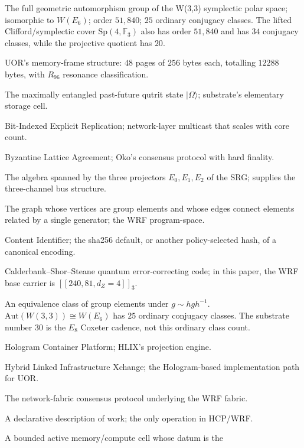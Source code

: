 \documentclass[11pt,letterpaper]{article}
\theoremstyle{remark}
\newcommand{\W}{W(3,3)}
\newcommand{\Sp}{\mathrm{Sp}}
\newcommand{\Aut}{\mathrm{Aut}}
\newcommand{\FF}{\mathbb{F}}
\newcommand{\ket}[1]{\lvert #1\rangle}
\begin{document}
\begin{description}[leftmargin=10em,style=nextline,nosep]
\item[Aut$(W(3,3))$] The full geometric automorphism group of the W(3,3) symplectic
polar space; isomorphic to $W(E_6)$; order $51{,}840$; $25$ ordinary conjugacy classes.
The lifted Clifford/symplectic cover $\Sp(4,\FF_3)$ also has order $51{,}840$ and has
$34$ conjugacy classes, while the projective quotient has $20$.
\item[Atlas-12288] UOR's memory-frame structure: $48$ pages of $256$ bytes each,
totalling $12288$ bytes, with $R_{96}$ resonance classification.
\item[Bell qutrit] The maximally entangled past-future qutrit state $\ket{\Omega}$;
substrate's elementary storage cell.
\item[BIER] Bit-Indexed Explicit Replication; network-layer multicast that scales with
core count.
\item[BLA] Byzantine Lattice Agreement; Oko's consensus protocol with hard finality.
\item[Bose--Mesner algebra] The algebra spanned by the three projectors $E_0, E_1, E_2$
of the SRG; supplies the three-channel bus structure.
\item[Cayley graph] The graph whose vertices are group elements and whose edges connect
elements related by a single generator; the WRF program-space.
\item[CID] Content Identifier; the sha256 default, or another policy-selected hash, of a
canonical encoding.
\item[CSS code] Calderbank--Shor--Steane quantum error-correcting code; in this paper,
the WRF base carrier is $[[240, 81, d_Z=4]]_3$.
\item[Conjugacy class] An equivalence class of group elements under $g \sim hgh^{-1}$.
$\Aut(\W)\cong W(E_6)$ has $25$ ordinary conjugacy classes. The substrate number $30$
is the $E_8$ Coxeter cadence, not this ordinary class count.
\item[HCP] Hologram Container Platform; HLIX's projection engine.
\item[HLIX] Hybrid Linked Infrastructure Xchange; the Hologram-based implementation path
for UOR.
\item[Oko] The network-fabric consensus protocol underlying the WRF fabric.
\item[Projection] A declarative description of work; the only operation in HCP/WRF.
\item[Referenceable flow cell] A bounded active memory/compute cell whose datum is the

\end{description}
\end{document}
